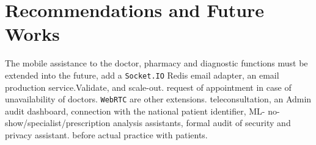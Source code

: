 \documentclass[12pt,a4paper]{report}
\begin{document}
\section{Recommendations and Future Works}

{
The mobile assistance to the doctor, pharmacy and diagnostic functions must be extended into the future,
add a \texttt{Socket.IO} Redis email adapter, an email production service.Validate, and scale-out.
request of appointment in case of unavailability of doctors. \texttt{WebRTC} are other extensions.
teleconsultation, an Admin audit dashboard, connection with the national patient identifier, ML-
no-show/specialist/prescription analysis assistants, formal audit of security and privacy assistant.
before actual practice with patients.\par}
\end{document}
